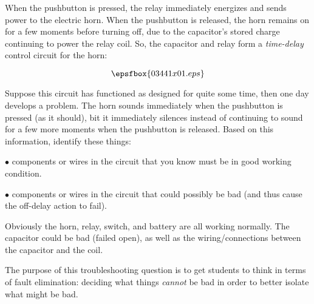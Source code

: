 

When the pushbutton is pressed, the relay immediately energizes and sends power to the electric horn.  When the pushbutton is released, the horn remains on for a few moments before turning off, due to the capacitor's stored charge continuing to power the relay coil.  So, the capacitor and relay form a {\it time-delay} control circuit for the horn:

$$\epsfbox{03441x01.eps}$$

Suppose this circuit has functioned as designed for quite some time, then one day develops a problem.  The horn sounds immediately when the pushbutton is pressed (as it should), bit it immediately silences instead of continuing to sound for a few more moments when the pushbutton is released.  Based on this information, identify these things:

\vskip 10pt

\medskip
\item{$\bullet$}  components or wires in the circuit that you know must be in good working condition.
\vskip 40pt
\item{$\bullet$}  components or wires in the circuit that could possibly be bad (and thus cause the off-delay action to fail).
\medskip







Obviously the horn, relay, switch, and battery are all working normally.  The capacitor could be bad (failed open), as well as the wiring/connections between the capacitor and the coil.







The purpose of this troubleshooting question is to get students to think in terms of fault elimination: deciding what things {\it cannot} be bad in order to better isolate what might be bad.




